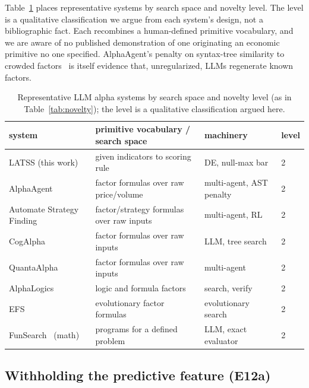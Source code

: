 \documentclass[11pt]{article}
\begin{document}
Table~\ref{tab:audit} places representative systems by search space and novelty level. The level is a
qualitative classification we argue from each system's design, not a bibliographic fact. Each
recombines a human-defined primitive vocabulary, and we are aware of no published demonstration of one
originating an economic primitive no one specified. AlphaAgent's penalty on syntax-tree similarity to
crowded factors~\cite{alphaagent} is itself evidence that, unregularized, LLMs regenerate known
factors.

\begin{table}[htbp]
\centering
\caption{Representative LLM alpha systems by search space and novelty level (as in
Table~\ref{tab:novelty}); the level is a qualitative classification argued here.}
\label{tab:audit}
\small
\begin{tabular}{@{}p{3.3cm} p{5.3cm} p{2.1cm} p{1.4cm}@{}}
\toprule
system & primitive vocabulary / search space & machinery & level \\
\midrule
LATSS (this work) & given indicators to scoring rule & DE, null-max bar & 2 \\
AlphaAgent~\cite{alphaagent} & factor formulas over raw price/volume & multi-agent, AST penalty & 2 \\
Automate Strategy Finding~\cite{automate} & factor/strategy formulas over raw inputs & multi-agent, RL & 2 \\
CogAlpha~\cite{cogalpha} & factor formulas over raw inputs & LLM, tree search & 2 \\
QuantaAlpha~\cite{quantaalpha} & factor formulas over raw inputs & multi-agent & 2 \\
AlphaLogics~\cite{alphalogics} & logic and formula factors & search, verify & 2 \\
EFS~\cite{efs} & evolutionary factor formulas & evolutionary search & 2 \\
FunSearch~\cite{funsearch} (math) & programs for a defined problem & LLM, exact evaluator & 2 \\
\bottomrule
\end{tabular}
\end{table}

\subsection{Withholding the predictive feature (E12a)}
\label{sec:e12a}
\end{document}
